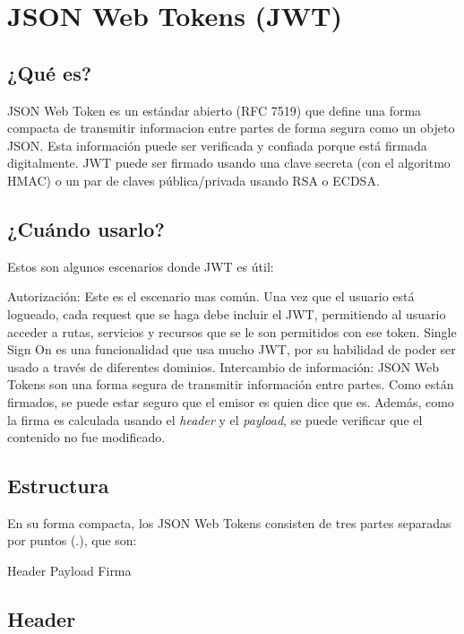 \section[JSON Web Tokens (JWT)]{JSON Web Tokens (JWT)}
\subsection[¿Qué es?]{¿Qué es?}

JSON Web Token es un estándar abierto (RFC 7519) que define una forma compacta de transmitir informacion entre partes de forma segura como un objeto JSON. Esta información puede ser verificada y confiada porque está firmada digitalmente. JWT puede ser firmado usando una clave secreta (con el algoritmo HMAC) o un par de claves pública/privada usando RSA o ECDSA.


\subsection[¿Cuándo usarlo?]{¿Cuándo usarlo?}

Estos son algunos escenarios donde JWT es útil:
\begin{outline}
    \1 Autorización: Este es el escenario mas común. Una vez que el usuario está logueado, cada request que se haga debe incluir el JWT, permitiendo al usuario acceder a rutas, servicios y recursos que se le son permitidos con ese token. Single Sign On es una funcionalidad que usa mucho JWT, por su habilidad de poder ser usado a través de diferentes dominios.
    \1 Intercambio de información: JSON Web Tokens son una forma segura de transmitir información entre partes. Como están firmados, se puede estar seguro que el emisor es quien dice que es. Además, como la firma es calculada usando el \textit{header} y el \textit{payload}, se puede verificar que el contenido no fue modificado.
\end{outline}
\subsection[Estructura]{Estructura}


En su forma compacta, los JSON Web Tokens consisten de tres partes separadas por puntos (.), que son:
\begin{outline}
    \2 Header
    \2 Payload
    \2 Firma
\end{outline}

\subsection[Header]{Header}

